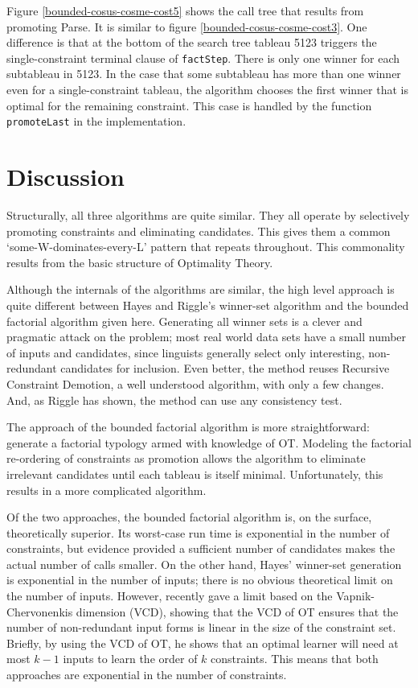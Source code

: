 \documentclass[11pt]{article}
\begin{document}
Figure \ref{bounded-cosus-cosme-cost5} shows the call tree that
results from promoting {\sc Parse}. It is similar to figure
\ref{bounded-cosus-cosme-cost3}. One difference is that at the bottom
of the search tree tableau 5123 triggers the single-constraint
terminal clause of {\tt factStep}. There is only one winner for each
subtableau in 5123.  In the case that some subtableau has more than
one winner even for a single-constraint tableau, the algorithm chooses
the first winner that is optimal for the remaining constraint. This
case is handled by the function {\tt promoteLast} in the
implementation.

\section{Discussion}
Structurally, all three algorithms are quite similar. They all operate
by selectively promoting constraints and eliminating candidates. This
gives them a common `some-W-dominates-every-L' pattern that repeats
throughout. This commonality results from the basic structure of Optimality Theory.

Although the internals of the algorithms are similar, the high level
approach is quite different between Hayes and Riggle's winner-set
algorithm and the bounded factorial algorithm given here. Generating
all winner sets is a clever and pragmatic attack on the problem; most
real world data sets have a small number of inputs and candidates,
since linguists generally select only interesting, non-redundant
candidates for inclusion. Even better, the method reuses Recursive
Constraint Demotion, a well understood algorithm, with only a few
changes. And, as Riggle has shown, the method can use any consistency
test.

The approach of the bounded factorial algorithm is more straightforward:
generate a factorial typology armed with knowledge of OT. Modeling
the factorial re-ordering of constraints as promotion allows the
algorithm to eliminate irrelevant candidates until each tableau is
itself minimal. Unfortunately, this results in a more complicated
algorithm.

Of the two approaches, the bounded factorial algorithm is, on the
surface, theoretically superior. Its worst-case run time is
exponential in the number of constraints, but evidence provided a
sufficient number of candidates makes the actual number of calls
smaller. On the other hand, Hayes' winner-set generation is
exponential in the number of inputs; there is no obvious theoretical
limit on the number of inputs. However,  recently
gave a limit based on the Vapnik-Chervonenkis dimension (VCD), showing
that the VCD of OT ensures that the number of non-redundant input
forms is linear in the size of the constraint set. Briefly, by using
the VCD of OT, he shows that an optimal learner will need at most
$k-1$ inputs to learn the order of $k$ constraints. This means that
both approaches are exponential in the number of constraints.
\end{document}
